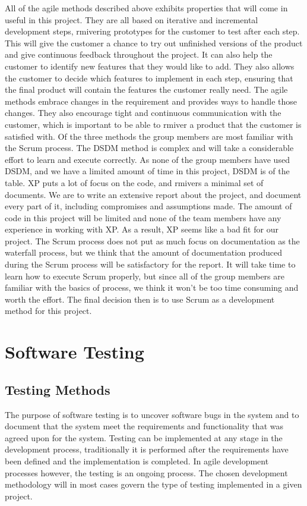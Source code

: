 All of the agile methods described above exhibits properties that will come in useful in this project. They are all based on iterative and incremental development steps, rmivering prototypes for the customer to test after each step. This will give the customer a chance to try out unfinished versions of the product and give continuous feedback throughout the project. It can also help the customer to identify new features that they would like to add. They also allows the customer to decide which features to implement in each step, ensuring that the final product will contain the features the customer really need. The agile methods embrace changes in the requirement and provides ways to handle those changes. They also encourage tight and continuous communication with the customer, which is important to be able to rmiver a product that the customer is satisfied with. Of the three methods the group members are most familiar with the Scrum process. The DSDM method is complex and will take a considerable effort to learn and execute correctly. As none of the group members have used DSDM, and we have a limited amount of time in this project, DSDM is of the table. XP puts a lot of focus on the code, and rmivers a minimal set of documents. We are to write an extensive report about the project, and document every part of it, including compromises and assumptions made. The amount of code in this project will be limited and none of the team members have any experience in working with XP. As a result, XP seems like a bad fit for our project. The Scrum process does not put as much focus on documentation as the waterfall process, but we think that the amount of documentation produced during the Scrum process will be satisfactory for the report. It will take time to learn how to execute Scrum properly, but since all of the group members are familiar with the basics of process, we think it won’t be too time consuming and worth the effort. The final decision then is to use Scrum as a development method for this project.

\section{Software Testing}

\subsection{Testing Methods}
The purpose of software testing is to uncover software bugs in the system and to document that the system meet the requirements and functionality that was agreed upon for the system. Testing can be implemented at any stage in the development process, traditionally it is performed after the requirements have been defined and the implementation is completed. In agile development processes however, the testing is an ongoing process. The chosen development methodology will in most cases govern the type of testing implemented in a given project.
\cite{sommerville2011software}

